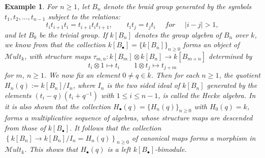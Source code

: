 \documentclass[10pt, colorlinks]{article}
\numberwithin{equation}{section} \DeclareMathSizes{2}{10}{12}{13}
\newtheorem{eg}[thm]{Example}
\begin{document}
     
     \begin{eg}
        \emph{ For $n\geq 1$, let $B_n$ denote the braid group generated by the symbols $t_1,t_2,\ldots,t_{n-1}$ subject to the relations:}
         \begin{equation*}
             t_it_{i+1}t_i=t_{i+1}t_it_{i+1},\qquad t_it_j=t_jt_i\quad\textit{ for } \quad |i-j|>1,
         \end{equation*}
        \emph{and let $B_0$ be the trivial group. If $k[B_n]$ denotes the group algebra of $B_n$ over $k$, we know from \cite[\S 4.1]{DAV} that the collection $k[B_\bullet]=\{k[B_n]\}_{n\geq 0}$ forms an object of $\mathscr Mult_k$, with  structure maps $\tau_{m,n}:k[B_m]\otimes k[B_n]\longrightarrow k[B_{m+n}]$ determined by 
        \begin{equation*}
        t_i\otimes 1\mapsto t_i\qquad 1\otimes t_j\mapsto t_{j+m}
        \end{equation*}
        for $m$, $n\geq 1$.
       We now fix an element $0\ne q\in k$. Then for each $n\geq 1$, the quotient  $H_n(q):=k[B_n]/I_n$, where $I_n$ is the two sided ideal of $k[B_n]$ generated by the elements $(t_i-q)(t_i+q^{-1})$ with $1\leq i\leq n-1$, is called the Hecke algebra. In \cite[\S 4.1]{DAV} it is also shown that the collection $H_\bullet(q)=\{H_n(q)\}_{n\geq 0}$ with $H_0(q)=k$, forms a multiplicative sequence of algebras, whose structure maps are descended from those of $k[B_\bullet]$.  It follows that the collection $\left\{k[B_n]\longrightarrow k[B_n]/I_n=H_n(q)\right\}_{n\geq 0}$ of canonical maps forms a morphism in $\mathscr Mult_k$. This shows that $H_\bullet(q)$ is a left $k[B_\bullet]$-bimodule.}
     \end{eg}
\end{document}
